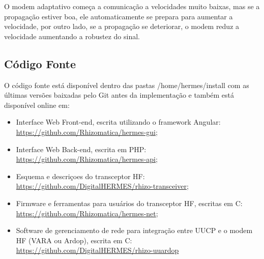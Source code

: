 \documentclass[11pt,a4paper]{article}
\begin{document}

O modem adaptativo começa a comunicação a velocidades muito baixas, mas se a propagação estiver boa, ele automaticamente se prepara para aumentar a velocidade, por outro lado, se a propagação se deteriorar, o modem reduz a velocidade aumentando a robustez do sinal. 
    
    

\subsection{Código Fonte}
\label{apx_src}

O código fonte está disponível dentro das pastas /home/hermes/install com as últimas versões baixadas pelo Git antes da implementação e também está disponível online em: 


\begin{itemize}
    \item Interface Web Front-end, escrita utilizando o framework Angular: \url{https://github.com/Rhizomatica/hermes-gui};
    \item Interface Web Back-end, escrita em PHP: \url{https://github.com/Rhizomatica/hermes-api}; 
    \item Esquema e descriçoes do transceptor HF: \url{https://github.com/DigitalHERMES/rhizo-transceiver};    
    \item Firmware e ferramentas para usuários do transceptor HF, escritas em C:
    \url{https://github.com/Rhizomatica/hermes-net};
    \item Software de gerenciamento de rede para integração entre UUCP e o modem HF (VARA ou Ardop), escrita em C:
    \url{https://github.com/DigitalHERMES/rhizo-uuardop}
\end{itemize}
\end{document}
